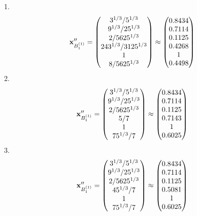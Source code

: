 \documentclass[10pt,a4paper]{article}
\begin{document}
	1.
	\[
		\bold{x}''_{B_1^{(1)}} = 
		\begin{pmatrix}
			{{3^ {1 / 3}}} / {{5^ {1 / 3}}} \\
			{{9^ {1 / 3}}} / {{25^ {1 / 3}}} \\
			{{2}} / {{5625^ {1 / 3}}} \\
			{{243^ {1 / 3}}} / {{3125^ {1 / 3}}} \\
			{1}{} \\
			{{8}} / {{5625^ {1 / 3}}} \\
		\end{pmatrix}
		\approx
		\begin{pmatrix}
			0.8434   \\
			0.7114   \\
			0.1125   \\
			0.4268   \\
			1        \\
			0.4498   \\
		\end{pmatrix}
	\]
	2.
	\[
		\bold{x}''_{B_1^{(1)}} = 
		\begin{pmatrix}
			{{3^ {1 / 3}}} / {{5^ {1 / 3}}} \\
			{{9^ {1 / 3}}} / {{25^ {1 / 3}}} \\
			{{2}} / {{5625^ {1 / 3}}} \\
			{{5}} / {{7}} \\
			{1}{} \\
			{{75^ {1 / 3}}} / {{7}} \\
		\end{pmatrix}
		\approx
		\begin{pmatrix}
			0.8434   \\
			0.7114   \\
			0.1125   \\
			0.7143   \\
			1        \\
			0.6025   \\
		\end{pmatrix}
	\]
	3.
	\[
		\bold{x}''_{B_1^{(1)}} = 
		\begin{pmatrix}
			{{3^ {1 / 3}}} / {{5^ {1 / 3}}} \\
			{{9^ {1 / 3}}} / {{25^ {1 / 3}}} \\
			{{2}} / {{5625^ {1 / 3}}} \\
			{{45^ {1 / 3}}} / {{7}} \\
			{1}{} \\
			{{75^ {1 / 3}}} / {{7}} \\
		\end{pmatrix}
		\approx
		\begin{pmatrix}
			0.8434   \\
			0.7114   \\
			0.1125   \\
			0.5081   \\
			1        \\
			0.6025   \\
		\end{pmatrix}
	\]
\end{document}
